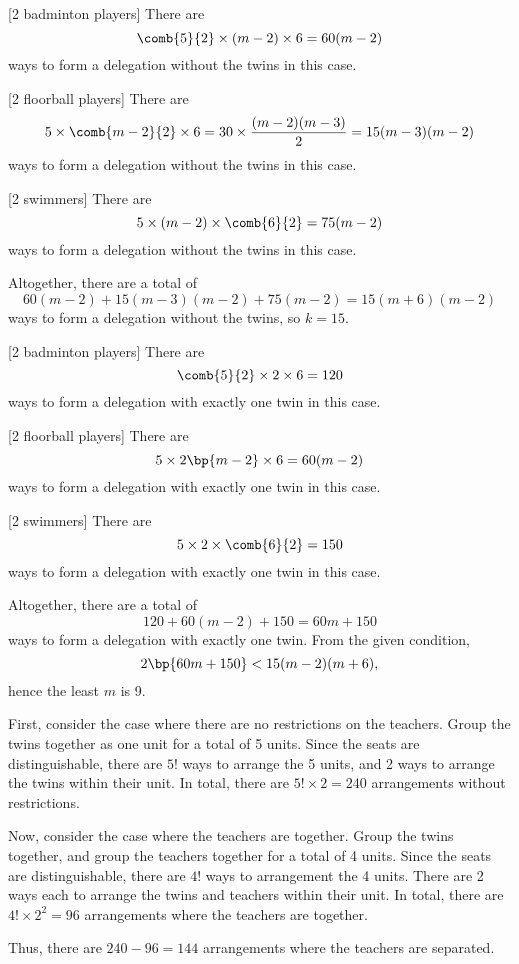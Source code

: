 \begin{solution}
    \begin{ppart}
        \phantom{.}
        
        [2 badminton players] There are \[\comb{5}{2} \times (m-2) \times 6 = 60(m-2)\] ways to form a delegation without the twins in this case.

        [2 floorball players] There are \[5 \times \comb{m-2}{2} \times 6 = 30 \times \frac{(m-2)(m-3)}{2} = 15(m-3)(m-2)\] ways to form a delegation without the twins in this case.

        [2 swimmers] There are \[5 \times (m-2) \times \comb{6}{2} = 75(m-2)\] ways to form a delegation without the twins in this case.

        Altogether, there are a total of \[60(m-2) + 15(m-3)(m-2) + 75(m-2) = 15(m+6)(m-2)\] ways to form a delegation without the twins, so $k = 15$.
    \end{ppart}
    \begin{ppart}
                \phantom{.}
        
        [2 badminton players] There are \[\comb{5}{2} \times 2 \times 6 = 120\] ways to form a delegation with exactly one twin in this case.

        [2 floorball players] There are \[5 \times 2\bp{m-2} \times 6 = 60(m-2)\] ways to form a delegation with exactly one twin in this case.

        [2 swimmers] There are \[5 \times 2 \times \comb{6}{2} = 150\] ways to form a delegation with exactly one twin in this case.

        Altogether, there are a total of \[120 + 60(m-2) + 150 = 60m + 150\] ways to form a delegation with exactly one twin. From the given condition, \[2\bp{60m + 150} < 15(m-2)(m+6),\] hence the least $m$ is 9.
    \end{ppart}

    First, consider the case where there are no restrictions on the teachers. Group the twins together as one unit for a total of 5 units. Since the seats are distinguishable, there are $5!$ ways to arrange the 5 units, and 2 ways to arrange the twins within their unit. In total, there are $5! \times 2 = 240$ arrangements without restrictions.

    Now, consider the case where the teachers are together. Group the twins together, and group the teachers together for a total of 4 units. Since the seats are distinguishable, there are $4!$ ways to arrangement the 4 units. There are 2 ways each to arrange the twins and teachers within their unit. In total, there are $4! \times 2^2 = 96$ arrangements where the teachers are together.

    Thus, there are $240 - 96 = 144$ arrangements where the teachers are separated.
\end{solution}